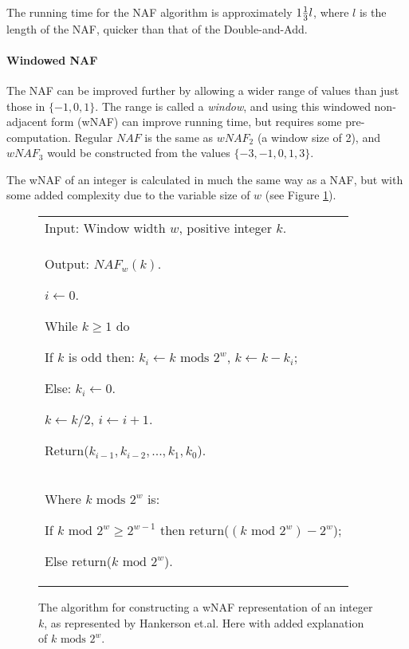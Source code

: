 The running time for the NAF algorithm is approximately \(1 {1 \over 3} l\), where \(l\) is the length of the NAF, quicker than that
of the Double-and-Add.\cite{hankerson2010}

\paragraph{Windowed NAF}

The NAF can be improved further by allowing a wider range of values than just those in \(\{-1,0,1\}\). The range is called a \emph{window}, and
using this windowed non-adjacent form (wNAF) can improve running time, but requires some pre-computation. Regular \(NAF\) is the same
as \(wNAF_2\) (a window size of 2), and \(wNAF_3\) would be constructed from the values \(\{-3,-1,0,1,3\}\).

The wNAF of an integer is calculated in much the same way as a NAF, but with some added complexity due to the variable size of \(w\)
(see Figure \ref{fig:compute-wnaf-algorithm}).

\begin{figure}[htb!]
	\begin{tabular}{|p{\textwidth}|}
		\hline
		Input: Window width \(w\), positive integer \(k\). \\
		Output: \(NAF_w(k)\).
		\begin{enumerate*}
			\item \(i \gets 0\).
			\item While \(k \geq 1\) do
			\begin{enumerate*}
				\item If \(k\) is odd then: \(k_i \gets k \text{ mods } 2^w\), \(k \gets k - k_i\);
				\item Else: \(k_i \gets 0\).
				\item \(k \gets k/2\), \(i \gets i + 1\).
			\end{enumerate*}
			\item Return(\(k_{i-1},k_{i-2},...,k_1,k_0\)).
		\end{enumerate*} \\
		\hline
		Where \(k \text{ mods } 2^w\) is: 
		\begin{enumerate*}
			\item If \(k \text{ mod } 2^w \geq 2^{w-1}\) then return(\((k \text{ mod } 2^w) - 2^w\));
			\item Else return(\(k \text{ mod } 2^w\)).
		\end{enumerate*} \\
		\hline
	\end{tabular}
	\caption{The algorithm for constructing a wNAF representation of an integer \(k\), as represented by Hankerson
		et.al.\cite{hankerson2010} Here with added explanation of \(k \text{ mods } 2^w\).}
	\label{fig:compute-wnaf-algorithm}
\end{figure}

